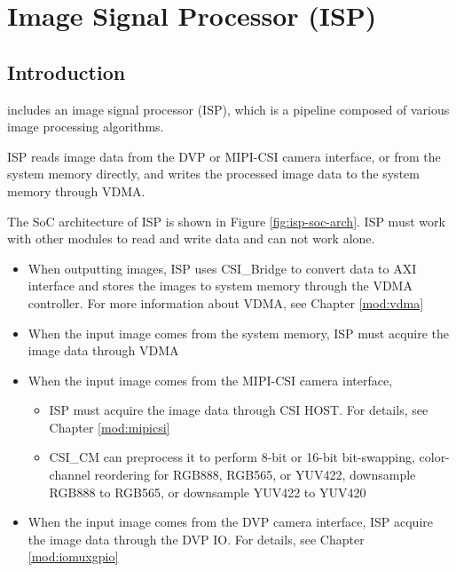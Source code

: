 \documentclass[main\_\_EN.tex]{subfiles}
\begin{document}

\ifglobal
\else
    {\let\clearpage\relax \listoftodos}
    {\let\clearpage\relax \listofdonetodos}
    \tableofcontents
\fi



\hypertarget{isp}{}
\chapter{Image Signal Processor (ISP)}
\label{mod:isp}



\section{Introduction}

\chipseries{} includes an image signal processor (ISP), which is a pipeline composed of various image processing algorithms.

ISP reads image data from the DVP or MIPI-CSI camera interface, or from the system memory directly, and writes the processed image data to the system memory through VDMA.

The SoC architecture of ISP is shown in Figure \ref{fig:isp-soc-arch}. ISP must work with other modules to read and write data and can not work alone.

\begin{itemize}
    \item When outputting images, ISP uses CSI\_Bridge to convert data to AXI interface and stores the images to system memory through the VDMA controller. For more information about VDMA, see Chapter \ref{mod:vdma} \textit{}
    \item When the input image comes from the system memory, ISP must acquire the image data through VDMA
    \item When the input image comes from the MIPI-CSI camera interface,
    \begin{itemize}
        \item ISP must acquire the image data through CSI HOST. For details, see Chapter \ref{mod:mipicsi} \textit{}
        \item CSI\_CM can preprocess it to perform 8-bit or 16-bit bit-swapping, color-channel reordering for RGB888, RGB565, or YUV422, downsample RGB888 to RGB565, or downsample YUV422 to YUV420
    \end{itemize}
    \item When the input image comes from the DVP camera interface, ISP acquire the image data through the DVP IO. For details, see Chapter \ref{mod:iomuxgpio} \textit{}
\end{itemize}
\end{document}
